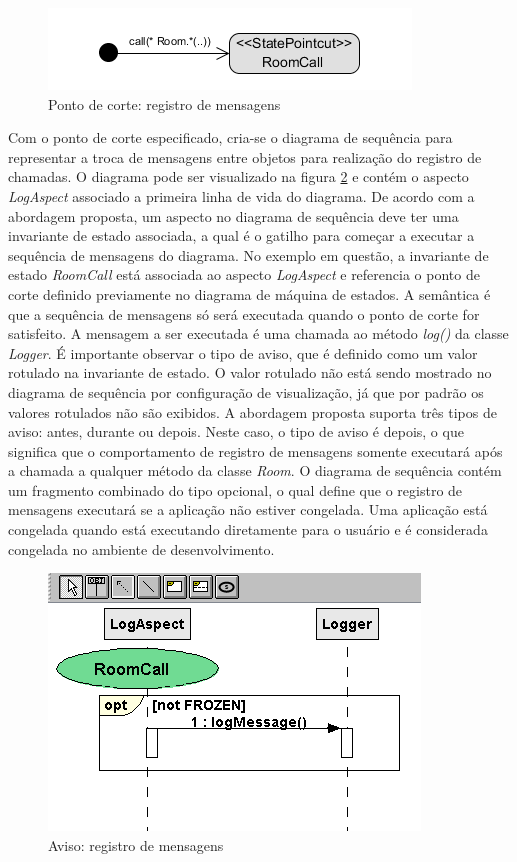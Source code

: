   \begin{figure}
	\centering
	\includegraphics{img/case_study_behavioral_pointcut_log.png}
	\caption{Ponto de corte: registro de mensagens}\label{fig:case_study_behavioral_pointcut_log}
  \end{figure}

Com o ponto de corte especificado, cria-se o diagrama de sequência para representar a troca de mensagens entre objetos para realização do registro de
chamadas. O diagrama pode ser visualizado na figura \ref{fig:case_study_behavioral_log} e contém o aspecto \textit{LogAspect} associado a primeira linha 
de vida do diagrama. De acordo com a abordagem proposta, um aspecto no diagrama de sequência deve ter uma invariante de estado associada, a qual é o
gatilho para começar a executar a sequência de mensagens do diagrama. No exemplo em questão, a invariante de estado \textit{RoomCall} está associada 
ao aspecto \textit{LogAspect} e referencia o ponto de corte definido previamente no diagrama de máquina de estados. A semântica é que 
a sequência de mensagens só será executada quando o ponto de corte for satisfeito. A mensagem a ser executada é uma chamada ao método \textit{log()}
da classe \textit{Logger}. É importante observar o tipo de aviso, que é definido como um valor rotulado na invariante de estado. O valor rotulado 
não está sendo mostrado no diagrama de sequência por configuração de visualização, já que por padrão os valores rotulados não são exibidos. A
abordagem proposta suporta três tipos de aviso: antes, durante ou depois. Neste caso, o tipo de aviso é depois, o que significa que o comportamento de 
registro de mensagens somente executará após a chamada a qualquer método da classe \textit{Room}. O diagrama de sequência contém um fragmento
combinado do tipo opcional, o qual define que o registro de mensagens executará se a aplicação não estiver congelada. Uma aplicação está congelada quando 
está executando diretamente para o usuário e é considerada congelada no ambiente de desenvolvimento.
  
  \begin{figure}
	\centering
	\includegraphics{img/case_study_behavioral_log.png}
	\caption{Aviso: registro de mensagens}\label{fig:case_study_behavioral_log}
  \end{figure}
  
